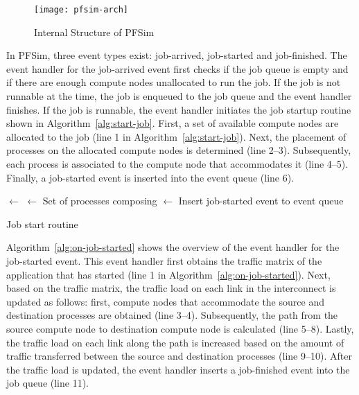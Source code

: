 \begin{figure}
    \centering
    \texttt{[image: pfsim-arch]}
    \caption{Internal Structure of PFSim}%
    \label{fig:pfsim-arch}
\end{figure}

In PFSim, three event types exist: job-arrived, job-started and job-finished.
The event handler for the job-arrived event first checks if the job queue is
empty and if there are enough compute nodes unallocated to run the job. If the
job is not runnable at the time, the job is enqueued to the job queue and the
event handler finishes. If the job is runnable, the event handler initiates
the job startup routine shown in Algorithm~\ref{alg:start-job}. First, a set
of available compute nodes are allocated to the job (line 1 in
Algorithm~\ref{alg:start-job}). Next, the placement of processes on the
allocated compute nodes is determined (line 2--3). Subsequently, each process
is associated to the compute node that accommodates it (line 4--5). Finally, a
job-started event is inserted into the event queue (line 6).

\begin{algorithm}

    \Nodes $\gets$ \allocateNodes{\Job}\;
    \Procs $\gets$ Set of processes composing \Job\;
    \Mapping $\gets$ \mapProcs{\Procs, \Nodes}\;
    Insert job-started event to event queue\;

    \caption{Job start routine}%
    \label{alg:start-job}
\end{algorithm}

Algorithm~\ref{alg:on-job-started} shows the overview of the event handler for
the job-started event. This event handler first obtains the traffic matrix of
the application that has started (line 1 in
Algorithm~\ref{alg:on-job-started}). Next, based on the traffic matrix, the
traffic load on each link in the interconnect is updated as follows: first,
compute nodes that accommodate the source and destination processes are
obtained (line 3--4). Subsequently, the path from the source compute node to
destination compute node is calculated (line 5--8). Lastly, the traffic load
on each link along the path is increased based on the amount of traffic
transferred between the source and destination processes (line 9--10). After
the traffic load is updated, the event handler inserts a job-finished event
into the job queue (line 11).

